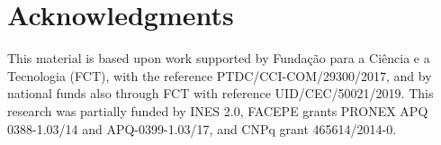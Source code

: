 \documentclass{article}
\begin{document}


\section*{Acknowledgments}

This material is based upon work supported by Fundação para a Ciência 
e a Tecnologia (FCT), with the reference PTDC/CCI-COM/29300/2017, and by 
national funds also through FCT with reference UID/CEC/50021/2019.
This research was partially funded by INES 2.0, FACEPE grants PRONEX 
APQ 0388-1.03/14 and APQ-0399-1.03/17, and CNPq grant 465614/2014-0.


{
  
  
}
\end{document}
